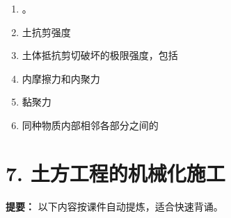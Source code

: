 \documentclass[UTF8,fontset=fandol,11pt]{ctexart}
\begin{document}
\begin{enumerate}[label=\arabic*.]
\item 。

\item 土抗剪强度

\item 土体抵抗剪切破坏的极限强度，包括

\item 内摩擦力和内聚力

\item 黏聚力

\item 同种物质内部相邻各部分之间的

\end{enumerate}

\newpage

\section*{7. 土方工程的机械化施工}


\begin{mainbox}

\textbf{提要：} 以下内容按课件自动提炼，适合快速背诵。

\end{mainbox}
\end{document}
